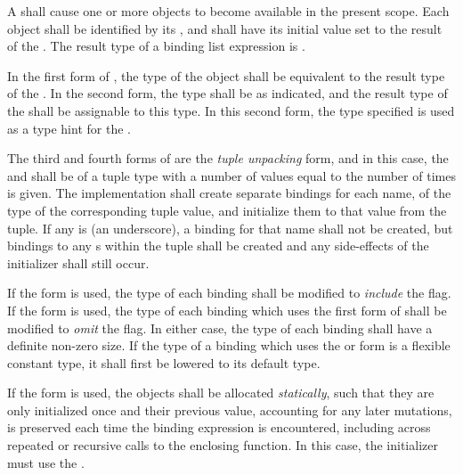 \specsubsubitem
A  shall cause one or more objects to become
available in the present scope. Each object shall be identified by its
, and shall have its initial value set to the result of the
. The result
type of a binding list expression is .

\specsubsubitem
In the first form of , the type of the object shall
be equivalent to the result type of the . In the
second form, the type shall be as indicated, and the result type of the
 shall be assignable to this type. In this second form,
the type specified is used as a type hint for the .

\specsubsubitem
The third and fourth forms of  are the \textit{tuple
unpacking} form, and in this case, the  and
 shall be of a tuple type with a number of values equal
to the number of times  is given. The implementation shall
create separate bindings for each name, of the type of the corresponding tuple
value, and initialize them to that value from the tuple. If any
 is \terminal{\_} (an underscore), a binding for that
name shall not be created, but bindings to any s within the tuple
shall be created and any side-effects of the initializer shall still occur.

\specsubsubitem
If the  form is used, the type of each binding shall be
modified to \textit{include} the  flag. If the 
form is used, the type of each binding which uses the first form of
 shall be modified to \textit{omit} the 
flag. In either case, the type of each binding shall have a definite non-zero
size. If the type of a binding which uses the  or 
form is a flexible constant type, it shall first be lowered to its default type.

\specsubsubitem
If the  form is used, the objects shall be allocated
\textit{statically}, such that they are only initialized once and their
previous value, accounting for any later mutations, is preserved each time
the binding expression is encountered, including across repeated or recursive
calls to the enclosing function. In this case, the initializer must use the
.

